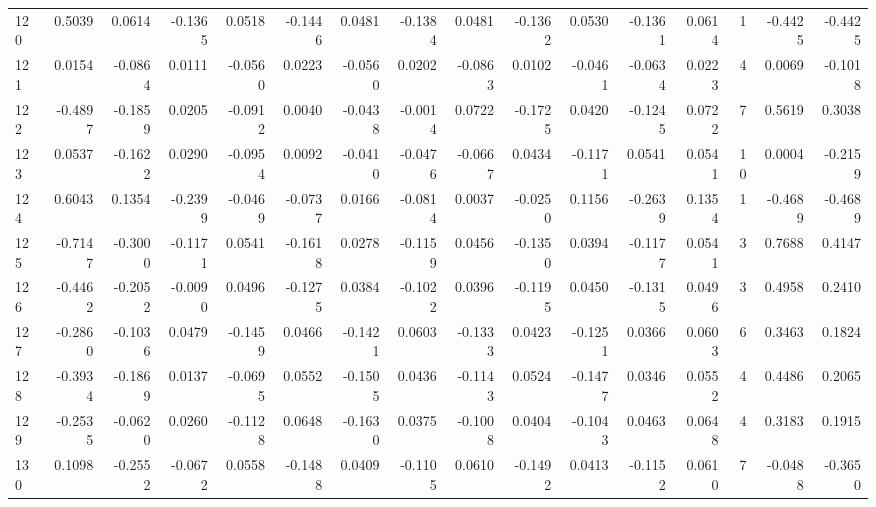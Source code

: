 \begin{tabular}{lrrrrrrrrrrrrrrr}
120 &      0.5039 &  0.0614 & -0.1365 &  0.0518 & -0.1446 &  0.0481 & -0.1384 &  0.0481 & -0.1362 &  0.0530 &  -0.1361 &     0.0614 &      1 &                   -0.4425 &                    -0.4425 \\
121 &      0.0154 & -0.0864 &  0.0111 & -0.0560 &  0.0223 & -0.0560 &  0.0202 & -0.0863 &  0.0102 & -0.0461 &  -0.0634 &     0.0223 &      4 &                    0.0069 &                    -0.1018 \\
122 &     -0.4897 & -0.1859 &  0.0205 & -0.0912 &  0.0040 & -0.0438 & -0.0014 &  0.0722 & -0.1725 &  0.0420 &  -0.1245 &     0.0722 &      7 &                    0.5619 &                     0.3038 \\
123 &      0.0537 & -0.1622 &  0.0290 & -0.0954 &  0.0092 & -0.0410 & -0.0476 & -0.0667 &  0.0434 & -0.1171 &   0.0541 &     0.0541 &     10 &                    0.0004 &                    -0.2159 \\
124 &      0.6043 &  0.1354 & -0.2399 & -0.0469 & -0.0737 &  0.0166 & -0.0814 &  0.0037 & -0.0250 &  0.1156 &  -0.2639 &     0.1354 &      1 &                   -0.4689 &                    -0.4689 \\
125 &     -0.7147 & -0.3000 & -0.1171 &  0.0541 & -0.1618 &  0.0278 & -0.1159 &  0.0456 & -0.1350 &  0.0394 &  -0.1177 &     0.0541 &      3 &                    0.7688 &                     0.4147 \\
126 &     -0.4462 & -0.2052 & -0.0090 &  0.0496 & -0.1275 &  0.0384 & -0.1022 &  0.0396 & -0.1195 &  0.0450 &  -0.1315 &     0.0496 &      3 &                    0.4958 &                     0.2410 \\
127 &     -0.2860 & -0.1036 &  0.0479 & -0.1459 &  0.0466 & -0.1421 &  0.0603 & -0.1333 &  0.0423 & -0.1251 &   0.0366 &     0.0603 &      6 &                    0.3463 &                     0.1824 \\
128 &     -0.3934 & -0.1869 &  0.0137 & -0.0695 &  0.0552 & -0.1505 &  0.0436 & -0.1143 &  0.0524 & -0.1477 &   0.0346 &     0.0552 &      4 &                    0.4486 &                     0.2065 \\
129 &     -0.2535 & -0.0620 &  0.0260 & -0.1128 &  0.0648 & -0.1630 &  0.0375 & -0.1008 &  0.0404 & -0.1043 &   0.0463 &     0.0648 &      4 &                    0.3183 &                     0.1915 \\
130 &      0.1098 & -0.2552 & -0.0672 &  0.0558 & -0.1488 &  0.0409 & -0.1105 &  0.0610 & -0.1492 &  0.0413 &  -0.1152 &     0.0610 &      7 &                   -0.0488 &                    -0.3650 \\

\end{tabular}

